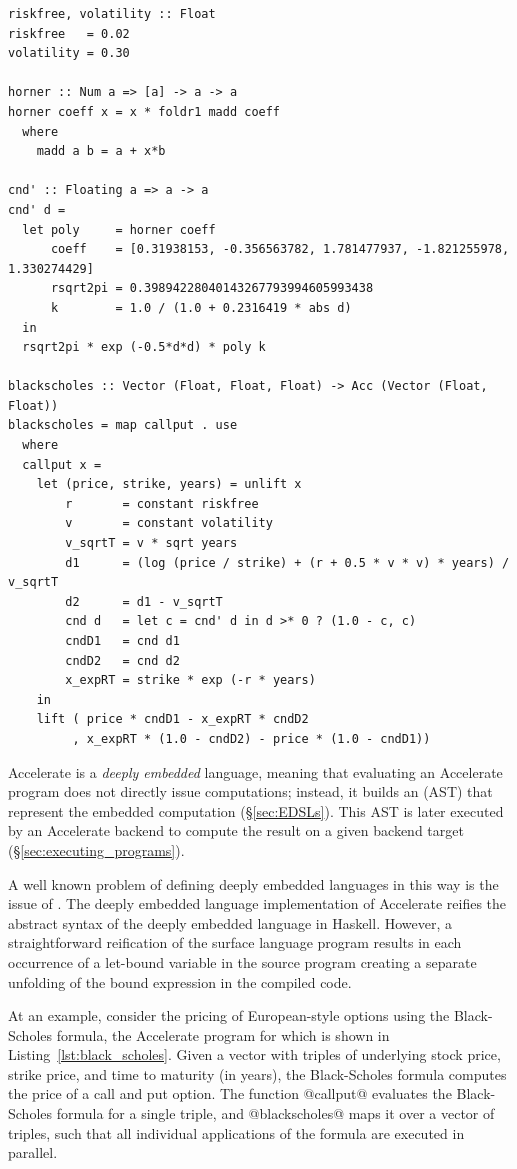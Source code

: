 \begin{lstlisting}[style=haskell_float
    ,float=t
    ,label=lst:black_scholes
    ,caption={Black-Scholes option pricing in Accelerate}]
riskfree, volatility :: Float
riskfree   = 0.02
volatility = 0.30

horner :: Num a => [a] -> a -> a
horner coeff x = x * foldr1 madd coeff
  where
    madd a b = a + x*b

cnd' :: Floating a => a -> a
cnd' d =
  let poly     = horner coeff
      coeff    = [0.31938153, -0.356563782, 1.781477937, -1.821255978, 1.330274429]
      rsqrt2pi = 0.39894228040143267793994605993438
      k        = 1.0 / (1.0 + 0.2316419 * abs d)
  in
  rsqrt2pi * exp (-0.5*d*d) * poly k

blackscholes :: Vector (Float, Float, Float) -> Acc (Vector (Float, Float))
blackscholes = map callput . use
  where
  callput x =
    let (price, strike, years) = unlift x
        r       = constant riskfree
        v       = constant volatility
        v_sqrtT = v * sqrt years
        d1      = (log (price / strike) + (r + 0.5 * v * v) * years) / v_sqrtT
        d2      = d1 - v_sqrtT
        cnd d   = let c = cnd' d in d >* 0 ? (1.0 - c, c)
        cndD1   = cnd d1
        cndD2   = cnd d2
        x_expRT = strike * exp (-r * years)
    in
    lift ( price * cndD1 - x_expRT * cndD2
         , x_expRT * (1.0 - cndD2) - price * (1.0 - cndD1))
\end{lstlisting}

Accelerate is a \emph{deeply embedded} language, meaning that evaluating an
Accelerate program does not directly issue computations; instead, it builds an
 (AST) that represent the embedded computation
(\S\ref{sec:EDSLs}). This AST is later executed by an Accelerate backend to
compute the result on a given backend target (\S\ref{sec:executing_programs}).

A well known problem of defining deeply embedded languages in this way is the
issue of . The deeply embedded language implementation of
Accelerate reifies the abstract syntax of the deeply embedded language in
Haskell. However, a straightforward reification of the surface language program
results in each occurrence of a let-bound variable in the source program
creating a separate unfolding of the bound expression in the compiled code.

At an example, consider the pricing of European-style options using the Black-Scholes formula, the
Accelerate program for which is shown in Listing~\ref{lst:black_scholes}. Given a vector with
triples of underlying stock price, strike price, and time to maturity (in years), the Black-Scholes
formula computes the price of a call and put option. The function @callput@ evaluates the
Black-Scholes formula for a single triple, and @blackscholes@ maps it over a vector of triples,
such that all individual applications of the formula are executed in parallel.

